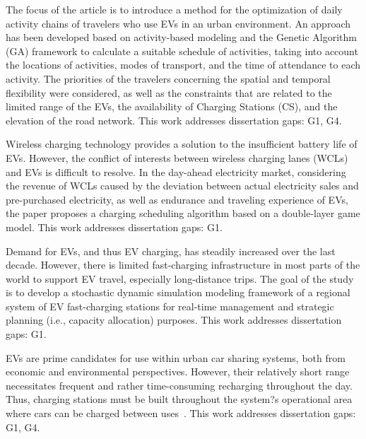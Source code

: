 \documentclass[letterpaper, 12pt, oneside, doublespacing]{Thesis}
\begin{document}
\noindent The focus of the article \cite{a_method_2020} is to introduce a method for the optimization of daily activity chains of travelers who use EVs in an urban environment. An approach has been developed based on activity-based modeling and the Genetic Algorithm (GA) framework to calculate a suitable schedule of activities, taking into account the locations of activities, modes of transport, and the time of attendance to each activity. The priorities of the travelers concerning the spatial and temporal flexibility were considered, as well as the constraints that are related to the limited range of the EVs, the availability of Charging Stations (CS), and the elevation of the road network. This work addresses dissertation gaps: G1, G4.



\noindent Wireless charging technology provides a solution to the insufficient battery life of EVs. However, the conflict of interests between wireless charging lanes (WCLs) and EVs is difficult to resolve. In the day-ahead electricity market, considering the revenue of WCLs caused by the deviation between actual electricity sales and pre-purchased electricity, as well as endurance and traveling experience of EVs, the paper \cite{double-layer_game_2020} proposes a charging scheduling algorithm based on a double-layer game model. This work addresses dissertation gaps: G1.



\noindent Demand for EVs, and thus EV charging, has steadily increased over the last decade. However, there is limited fast-charging infrastructure in most parts of the world to support EV travel, especially long-distance trips. The goal of the study \cite{dynamic_modeling_2020} is to develop a stochastic dynamic simulation modeling framework of a regional system of EV fast-charging stations for real-time management and strategic planning (i.e., capacity allocation) purposes. This work addresses dissertation gaps: G1.



\noindent EVs are prime candidates for use within urban car sharing systems, both from economic and environmental perspectives. However, their relatively short range necessitates frequent and rather time-consuming recharging throughout the day. Thus, charging stations must be built throughout the system?s operational area where cars can be charged between uses~\cite{location_of_2020}. This work addresses dissertation gaps: G1, G4.
\end{document}
